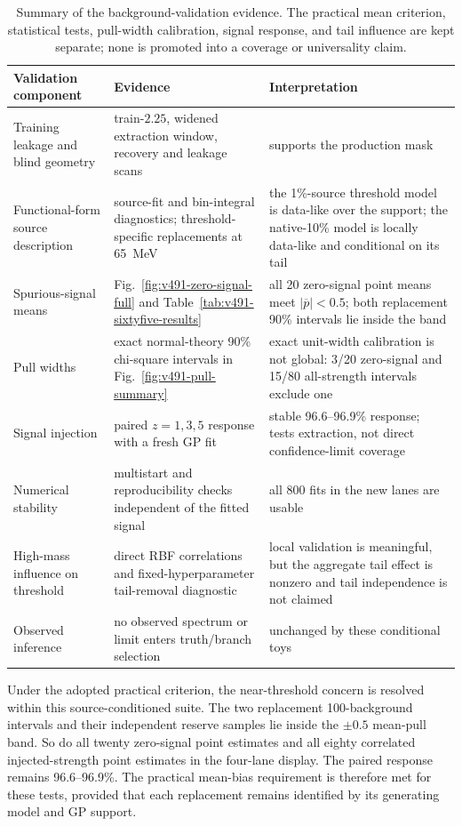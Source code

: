 \begin{table}[htbp]
\centering
\small
\begin{tabularx}{\textwidth}{P{0.25\textwidth}P{0.22\textwidth}Y}
\toprule
Validation component & Evidence & Interpretation \\
\midrule
Training leakage and blind geometry & train-$2.25$, widened extraction window, recovery and leakage scans & supports the production mask \\
Functional-form source description & source-fit and bin-integral diagnostics; threshold-specific replacements at 65~MeV & the 1\%-source threshold model is data-like over the support; the native-10\% model is locally data-like and conditional on its tail \\
Spurious-signal means & Fig.~\ref{fig:v491-zero-signal-full} and Table~\ref{tab:v491-sixtyfive-results} & all 20 zero-signal point means meet $|\overline p|<0.5$; both replacement 90\% intervals lie inside the band \\
Pull widths & exact normal-theory 90\% chi-square intervals in Fig.~\ref{fig:v491-pull-summary} & exact unit-width calibration is not global: 3/20 zero-signal and 15/80 all-strength intervals exclude one \\
Signal injection & paired $z=1,3,5$ response with a fresh GP fit & stable 96.6--96.9\% response; tests extraction, not direct confidence-limit coverage \\
Numerical stability & multistart and reproducibility checks independent of the fitted signal & all 800 fits in the new lanes are usable \\
High-mass influence on threshold & direct RBF correlations and fixed-hyperparameter tail-removal diagnostic & local validation is meaningful, but the aggregate tail effect is nonzero and tail independence is not claimed \\
Observed inference & no observed spectrum or limit enters truth/branch selection & unchanged by these conditional toys \\
\bottomrule
\end{tabularx}
\caption{Summary of the background-validation evidence.  The practical mean
criterion, statistical tests, pull-width calibration, signal response, and tail
influence are kept separate; none is promoted into a coverage or universality claim.}
\label{tab:v491-background-validation-decision}
\end{table}

Under the adopted practical criterion, the near-threshold concern is resolved within
this source-conditioned suite.  The two replacement 100-background intervals and their
independent reserve samples lie inside the $\pm0.5$ mean-pull band.  So do all twenty
zero-signal point estimates and all eighty correlated injected-strength point estimates
in the four-lane display.  The paired response remains 96.6--96.9\%.  The practical
mean-bias requirement is therefore met for these tests, provided that each replacement
remains identified by its generating model and GP support.

